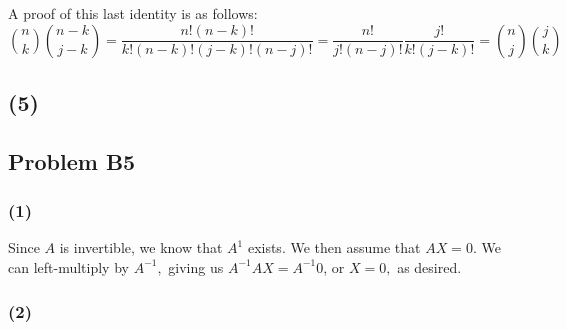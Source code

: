 \documentclass{article}
\begin{document}
A proof of this last identity is as follows:
\[\binom{n}{k}\binom{n-k}{j-k} = \frac{n!(n-k)!}{k!(n-k)!(j-k)!(n-j)!}
=\frac{n!}{j!(n-j)!}\frac{j!}{k!(j-k)!} = \binom{n}{j}\binom{j}{k}\]

\subsection{(5)}

\subsection{Problem B5}
\subsubsection{(1)}
Since $A$ is invertible, we know that $A^{1}$ exists.
We then assume that $AX = 0.$ We can left-multiply by $A^{-1},$ giving us
$A^{-1}AX =  A^{-1}0$, or $X = 0,$ as desired.

\subsubsection{(2)}
\end{document}
